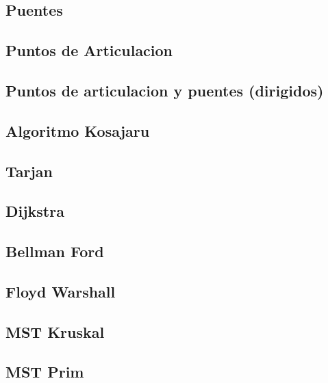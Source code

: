 \subsection{Puentes}
\raggedbottom
\hrulefill
\subsection{Puntos de Articulacion}
\raggedbottom
\hrulefill
\subsection{Puntos de articulacion y puentes (dirigidos)}
\raggedbottom
\hrulefill
\subsection{Algoritmo Kosajaru}
\raggedbottom
\hrulefill
\subsection{Tarjan}
\raggedbottom
\hrulefill
\subsection{Dijkstra}
\raggedbottom
\hrulefill
\subsection{Bellman Ford}
\raggedbottom
\hrulefill
\subsection{Floyd Warshall}
\raggedbottom
\hrulefill
\subsection{MST Kruskal}
\raggedbottom
\hrulefill
\subsection{MST Prim}
\raggedbottom
\hrulefill
